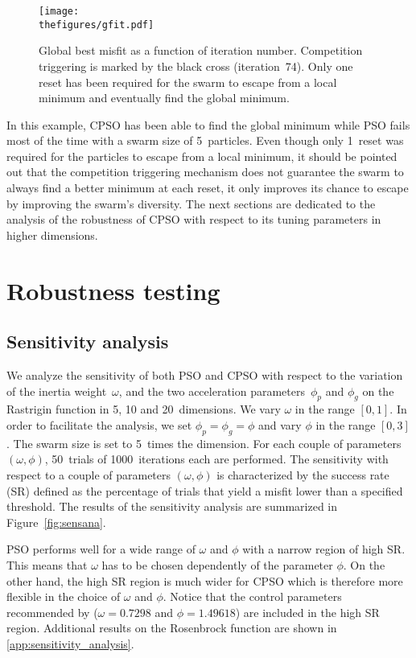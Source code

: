 \begin{figure}[!htbp]
	\centering
	\texttt{[image: \\thefigures/gfit.pdf]}
	\caption{Global best misfit as a function of iteration number. Competition triggering is marked by the black cross (iteration~74). Only one reset has been required for the swarm to escape from a local minimum and eventually find the global minimum.}	
	\label{fig:gfit}
\end{figure}

In this example, CPSO has been able to find the global minimum while PSO fails most of the time with a swarm size of 5~particles. Even though only 1~reset was required for the particles to escape from a local minimum, it should be pointed out that the competition triggering mechanism does not guarantee the swarm to always find a better minimum at each reset, it only improves its chance to escape by improving the swarm's diversity. The next sections are dedicated to the analysis of the robustness of CPSO with respect to its tuning parameters in higher dimensions.


\section{Robustness testing}
\label{sec:robustness_testing}


\subsection{Sensitivity analysis}
\label{ssec:sensitivity_analysis}

We analyze the sensitivity of both PSO and CPSO with respect to the variation of the inertia weight~$\omega$, and the two acceleration parameters~$\phi_{p}$ and $\phi_{g}$ on the Rastrigin function in 5, 10 and 20~dimensions. We vary $\omega$ in the range $\left[ 0, 1 \right]$. In order to facilitate the analysis, we set $\phi_{p} = \phi_{g} = \phi$ and vary $\phi$ in the range $\left[ 0, 3 \right]$. The swarm size is set to 5~times the dimension. For each couple of parameters $\left( \omega, \phi \right)$, 50~trials of 1000~iterations each are performed. The sensitivity with respect to a couple of parameters $\left( \omega, \phi \right)$ is characterized by the success rate (SR) defined as the percentage of trials that yield a misfit lower than a specified threshold. The results of the sensitivity analysis are summarized in Figure~\ref{fig:sensana}.

PSO performs well for a wide range of $\omega$ and $\phi$ with a narrow region of  high SR. This means that $\omega$ has to be chosen dependently of the parameter $\phi$. On the other hand, the high SR region is much wider for CPSO which is therefore more flexible in the choice of $\omega$ and $\phi$. Notice that the control parameters recommended by \cite{Eberhart2000} ($\omega = 0.7298$ and $\phi = 1.49618$) are included in the high SR region. Additional results on the Rosenbrock function are shown in \ref{app:sensitivity_analysis}.

